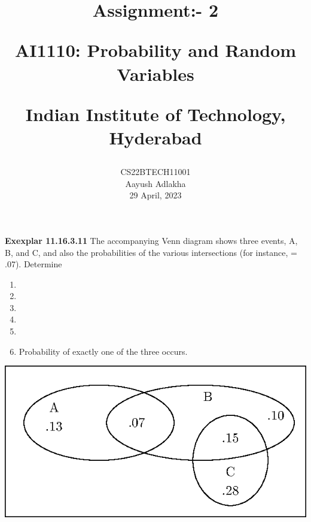 \documentclass[journal,12pt,twocolumn]{IEEEtran}
\begin{document}
\let\vec\mathbf


\vspace{3cm}

\title{
	Assignment:- 2
 
	\Large AI1110: Probability and Random Variables
 
	\Large Indian Institute of Technology, Hyderabad
}
\author{
	CS22BTECH11001
	
	Aayush Adlakha
 
	29 April, 2023
}






\maketitle

\newpage


\bigskip
\renewcommand{\thefigure}{\theenumi}
\renewcommand{\thetable}{\theenumi}
\textbf{Exexplar 11.16.3.11}
The accompanying Venn diagram shows three events, A, B, and C, and also the probabilities of the various intersections (for instance,  = .07). Determine
\begin{enumerate}[label=(\alph*)]
\item 
{}
\item 
{}
\item 
{}
\item 
{}
\item 
{}
\item 
Probability of exactly one
of the three occurs.
\end{enumerate}
\includegraphics[scale=1]{Figures/new-figure0}
\end{document}
